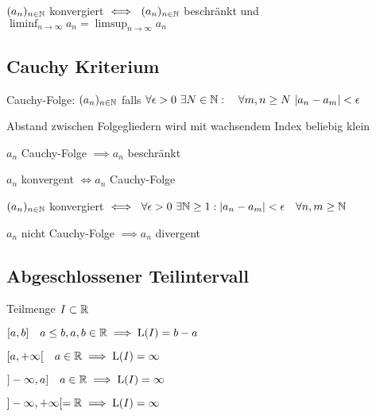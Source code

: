 \begin{compactitem}
    \item $(a_n)_{n \in \mathbb{N}}$ konvergiert $\iff \ (a_n)_{n \in \mathbb{N}}$ beschränkt und $\liminf_{n \to \infty} a_n = \limsup_{n \to \infty} a_n$
\end{compactitem}

\subsection{Cauchy Kriterium}
\begin{compactdesc}
    \item[Cauchy-Folge:] $(a_n)_{n \in \mathbb{N}}$ falls $\forall \epsilon > 0 \ \exists N \in \N: \quad \forall m,n \ge N \ |a_n - a_m| < \epsilon$
        \begin{compactitem}
            \item Abstand zwischen Folgegliedern wird mit wachsendem Index beliebig klein
        \end{compactitem}
\end{compactdesc}

\begin{compactitem}
    \item $a_n$ Cauchy-Folge $\implies a_n$ beschränkt
    \item $a_n$ konvergent $\iff a_n$ Cauchy-Folge
    \item $(a_n)_{n \in \mathbb{N}}$ konvergiert $\iff \ \forall \epsilon > 0 \ \exists \mathbb{N} \ge 1: |a_n - a_m| < \epsilon \quad \forall n,m \ge \mathbb{N}$
    \item $a_n$ nicht Cauchy-Folge $\implies a_n$ divergent
\end{compactitem}

\subsection{Abgeschlossener Teilintervall}
Teilmenge $I \subset \mathbb{R}$
\begin{compactenum}
    \item $[a, b] \quad a \le b, a,b \in \mathbb{R} \implies \text{L}(I) = b - a$
    \item $[a, +\infty[ \quad a \in \mathbb{R} \implies \text{L}(I) = \infty$
    \item $]-\infty, a] \quad a \in \mathbb{R} \implies \text{L}(I) = \infty$
    \item $]-\infty, +\infty[ = \mathbb{R} \implies \text{L}(I) = \infty$
\end{compactenum}

